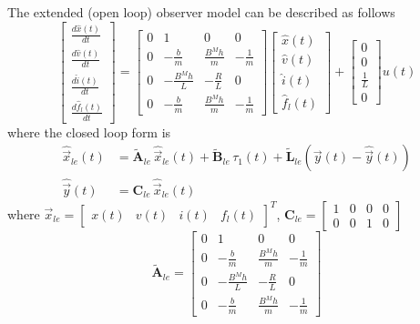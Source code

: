 \documentclass[11pt,a4paper,oneside]{book}
\numberwithin{equation}{section}
\theoremstyle{it}
\theoremstyle{definition}
\begin{document}
The extended (open loop) observer model can be described as follows
\begin{equation}\label{extended_1}
	\begin{bmatrix}
		\frac{d\hat{x}(t)}{dt} \\[6pt]
		\frac{d\hat{v}(t)}{dt} \\[6pt]
		\frac{d\hat{i}(t)}{dt} \\[6pt]
		\frac{d\hat{f}_l(t)}{dt} 
	\end{bmatrix} = 
	\begin{bmatrix}
		0 & 1 & 0 & 0\\[6pt]
		0 & -\frac{b}{m} & \frac{B^{M}h}{m} & -\frac{1}{m} \\[6pt]
		0 & -\frac{B^{M}h}{L} & -\frac{R}{L} & 0 \\[6pt]
		0 & -\frac{b}{m} & \frac{B^{M}h}{m} & -\frac{1}{m}
	\end{bmatrix}
	\begin{bmatrix}
		{\hat{x}(t)} \\[6pt]
		{\hat{v}(t)} \\[6pt]
		{\hat{i}(t)} \\[6pt]
		\hat{f}_l(t) 
	\end{bmatrix} + 
	\begin{bmatrix}
		0 \\[6pt]
		0 \\[6pt]
		\frac{1}{L} \\[6pt]
		0
	\end{bmatrix} u(t)
\end{equation}
where the closed loop form is
\begin{equation}
	\begin{aligned}
		\hat{\vec{x}}_{le}(t)  &= \tilde{\mathbf{A}}_{le} 
		\,\hat{\vec{x}}_{le}(t) +\tilde{\mathbf{B}}_{le} 
		\,\tau_1(t)+\tilde{\mathbf{L}}_{le} \left( \vec{y}(t) - 
		\hat{\vec{y}}(t) \right)  \\[6pt]
		\hat{\vec{y}}(t)  &= \mathbf{C}_{le} \,\hat{\vec{x}}_{le}(t)
	\end{aligned}
\end{equation}
where $\vec{x}_{le} = \begin{bmatrix} x(t) & v(t) & i(t) & f_l(t) 
\end{bmatrix}^T$, $\mathbf{C}_{le} = \begin{bmatrix} 1 & 0 & 0 & 0 \\ 0 & 0 & 1 
	& 0 \end{bmatrix}$
\begin{equation}
	\tilde{\mathbf{A}}_{le} = 
	\begin{bmatrix}
		0 & 1 & 0 & 0\\[6pt]
		0 & -\frac{b}{m} & \frac{B^{M}h}{m} & -\frac{1}{m} \\[6pt]
		0 & -\frac{B^{M}h}{L} & -\frac{R}{L} & 0 \\[6pt]
		0 & -\frac{b}{m} & \frac{B^{M}h}{m} & -\frac{1}{m}
	\end{bmatrix}
\end{equation}
\end{document}
